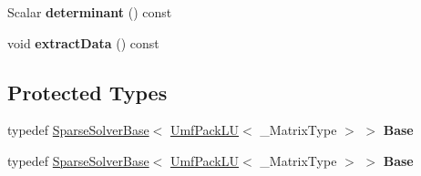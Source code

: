 \begin{DoxyCompactItemize}
\item 
\mbox{\label{class_eigen_1_1_umf_pack_l_u_a86c73f321f206612e2f8d3552a4015cd}} 
Scalar {\bfseries determinant} () const
\item 
\mbox{\label{class_eigen_1_1_umf_pack_l_u_aaf13ae41d479ba52f682db55c62239a4}} 
void {\bfseries extract\+Data} () const
\end{DoxyCompactItemize}
\subsection*{Protected Types}
\begin{DoxyCompactItemize}
\item 
\mbox{\label{class_eigen_1_1_umf_pack_l_u_af627be039e9d4054480287e2a79dd860}} 
typedef \hyperlink{group___sparse_core___module_class_eigen_1_1_sparse_solver_base}{Sparse\+Solver\+Base}$<$ \hyperlink{class_eigen_1_1_umf_pack_l_u}{Umf\+Pack\+LU}$<$ \+\_\+\+Matrix\+Type $>$ $>$ {\bfseries Base}
\item 
\mbox{\label{class_eigen_1_1_umf_pack_l_u_af627be039e9d4054480287e2a79dd860}} 
typedef \hyperlink{group___sparse_core___module_class_eigen_1_1_sparse_solver_base}{Sparse\+Solver\+Base}$<$ \hyperlink{class_eigen_1_1_umf_pack_l_u}{Umf\+Pack\+LU}$<$ \+\_\+\+Matrix\+Type $>$ $>$ {\bfseries Base}
\end{DoxyCompactItemize}
